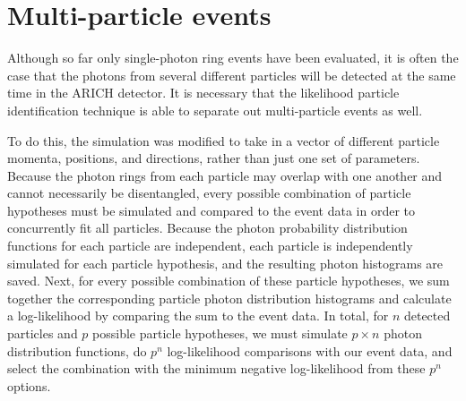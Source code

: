 \begin{figure}[]
\centering
{}
\caption[\TODO{}]{}
\label{fig:angleSeps}
\end{figure}

\section{Multi-particle events}
\label{sec:multiparticle}
Although so far only single-photon ring events have been evaluated, it is often the case that the photons from several different particles will be detected at the same time in the ARICH detector.
It is necessary that the likelihood particle identification technique is able to separate out multi-particle events as well. 

To do this, the simulation was modified to take in a vector of different particle momenta, positions, and directions, rather than just one set of parameters.
Because the photon rings from each particle may overlap with one another and cannot necessarily be disentangled, every possible combination of particle hypotheses must be simulated and compared to the event data in order to concurrently fit all particles.
Because the photon probability distribution functions for each particle are independent, each particle is independently simulated for each particle hypothesis, and the resulting photon histograms are saved.
Next, for every possible combination of these particle hypotheses, we sum together the corresponding particle photon distribution histograms and calculate a log-likelihood by comparing the sum to the event data.
In total, for $n$ detected particles and $p$ possible particle hypotheses, we must simulate $p \times n$ photon distribution functions, do $p^n$  log-likelihood comparisons with our event data, and select the combination with the minimum negative log-likelihood from these $p^n$ options. 

